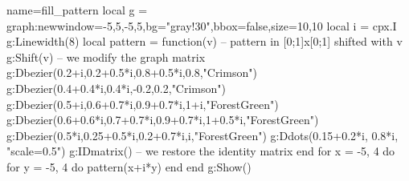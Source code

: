 \documentclass{standalone}%
\begin{document}
\begin{luadraw}{name=fill_pattern}
local g = graph:new{window={-5,5,-5,5},bg="gray!30",bbox=false,size={10,10}}
local i = cpx.I
g:Linewidth(8)
local pattern = function(v) -- pattern in [0;1]x[0;1] shifted with v
    g:Shift(v) -- we modify the graph matrix
    g:Dbezier({0.2+i,0.2+0.5*i,0.8+0.5*i,0.8},"Crimson")
    g:Dbezier({0.4+0.4*i,0.4*i,-0.2,0.2},"Crimson")
    g:Dbezier({0.5+i,0.6+0.7*i,0.9+0.7*i,1+i},"ForestGreen")
    g:Dbezier({0.6+0.6*i,0.7+0.7*i,0.9+0.7*i,1+0.5*i},"ForestGreen")
    g:Dbezier({0.5*i,0.25+0.5*i,0.2+0.7*i,i},"ForestGreen")
    g:Ddots({0.15+0.2*i, 0.8*i}, "scale=0.5")
    g:IDmatrix() -- we restore the identity matrix
end
for x = -5, 4 do
    for y = -5, 4 do
        pattern(x+i*y)
    end
end
g:Show() 
\end{luadraw}
\end{document}
